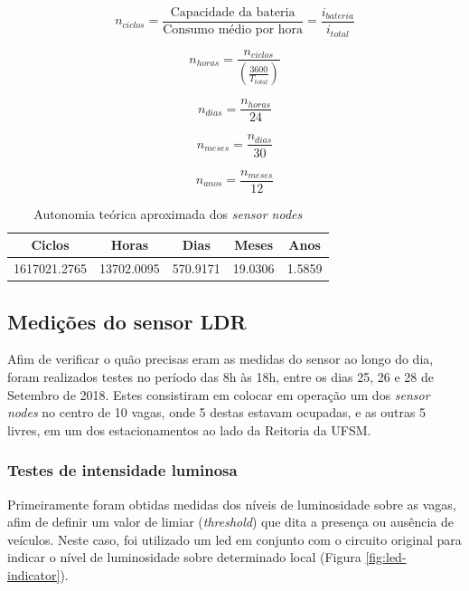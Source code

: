 \documentclass[oneside,openright,12pt]{ufsm_2015} %
\begin{document}
    \begin{equation}
    n_{ciclos} = \frac{\text{Capacidade da bateria}}{\text{Consumo médio por hora}} = \frac{i_{bateria}}{i_{total}}
    \end{equation}

    \begin{equation}
        n_{horas} = \frac{n_{ciclos}}{(\frac{3600}{T_{total}})}
    \end{equation}
    
    \begin{equation}
        n_{dias} = \frac{n_{horas}}{24}
    \end{equation}

    \begin{equation}
        n_{meses} = \frac{n_{dias}}{30}
    \end{equation}
    
    \begin{equation}
        n_{anos} = \frac{n_{meses}}{12}
    \end{equation}

    \begin{table}[ht]
         \centering
         \caption{Autonomia teórica aproximada dos \textit{sensor nodes}}
         \begin{tabular}{ c c c c c }
             \hline
             Ciclos & Horas & Dias & Meses & Anos \\
             \hline
             1617021.2765 & 13702.0095 & 570.9171 & 19.0306 & 1.5859 \\
             \hline
         \end{tabular}
         \vspace{\baselineskip} %
          \label{table:autonomia}
    \end{table}
    
    \subsection{Medições do sensor LDR}
    Afim de verificar o quão precisas eram as medidas do sensor ao longo do dia, foram realizados testes no período das 8h às 18h, entre os dias 25, 26 e 28 de Setembro de 2018. Estes consistiram em colocar em operação um dos \textit{sensor nodes} no centro de 10 vagas, onde 5 destas estavam ocupadas, e as outras 5 livres, em um dos estacionamentos ao lado da Reitoria da UFSM. 
    
    \subsubsection{Testes de intensidade luminosa}
    Primeiramente foram obtidas medidas dos níveis de luminosidade sobre as vagas, afim de definir um valor de limiar (\textit{threshold}) que dita a presença ou ausência de veículos. Neste caso, foi utilizado um led em conjunto com o circuito original para indicar o nível de luminosidade sobre determinado local (Figura \ref{fig:led-indicator}).
    
\end{document}
